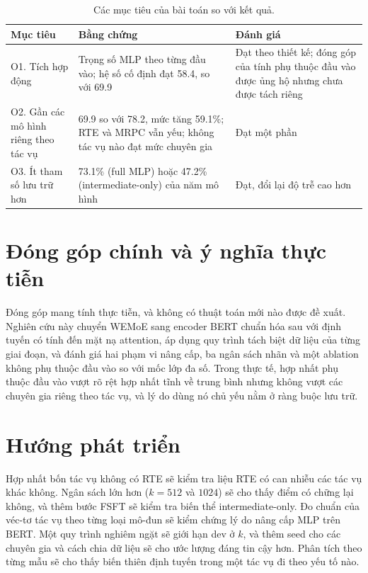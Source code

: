\begin{table}[htbp]
  \centering\tablestyle
  \caption{Các mục tiêu của bài toán so với kết quả.}
  \label{tab:goals}
  \begin{tabularx}{\linewidth}{>{\raggedright\arraybackslash}p{3.2cm} X >{\raggedright\arraybackslash}p{5.2cm}}
    \toprule
    Mục tiêu & Bằng chứng & Đánh giá\\
    \midrule
    O1. Tích hợp động & Trọng số MLP theo từng đầu vào; hệ số cố định đạt 58.4, so với 69.9 & Đạt theo thiết kế; đóng góp của tính phụ thuộc đầu vào được ủng hộ nhưng chưa được tách riêng\\
    O2. Gần các mô hình riêng theo tác vụ & 69.9 so với 78.2, mức tăng 59.1\%; RTE và MRPC vẫn yếu; không tác vụ nào đạt mức chuyên gia & Đạt một phần\\
    O3. Ít tham số lưu trữ hơn & 73.1\% (full MLP) hoặc 47.2\% (intermediate-only) của năm mô hình & Đạt, đổi lại độ trễ cao hơn\\
    \bottomrule
  \end{tabularx}
\end{table}

\section{Đóng góp chính và ý nghĩa thực tiễn}

Đóng góp mang tính thực tiễn, và không có thuật toán mới nào được đề xuất. Nghiên cứu này chuyển WEMoE sang encoder BERT chuẩn hóa sau với định tuyến có tính đến mặt nạ attention, áp dụng quy trình tách biệt dữ liệu của từng giai đoạn, và đánh giá hai phạm vi nâng cấp, ba ngân sách nhãn và một ablation không phụ thuộc đầu vào so với mốc lớp đa số. Trong thực tế, hợp nhất phụ thuộc đầu vào vượt rõ rệt hợp nhất tĩnh về trung bình nhưng không vượt các chuyên gia riêng theo tác vụ, và lý do dùng nó chủ yếu nằm ở ràng buộc lưu trữ.

\section{Hướng phát triển}

Hợp nhất bốn tác vụ không có RTE sẽ kiểm tra liệu RTE có can nhiễu các tác vụ khác không. Ngân sách lớn hơn ($k=512$ và $1024$) sẽ cho thấy điểm có chững lại không, và thêm bước FSFT sẽ kiểm tra biến thể intermediate-only. Đo chuẩn của véc-tơ tác vụ theo từng loại mô-đun sẽ kiểm chứng lý do nâng cấp MLP trên BERT. Một quy trình nghiêm ngặt sẽ giới hạn dev ở $k$, và thêm seed cho các chuyên gia và cách chia dữ liệu sẽ cho ước lượng đáng tin cậy hơn. Phân tích theo từng mẫu sẽ cho thấy biến thiên định tuyến trong một tác vụ đi theo yếu tố nào.
